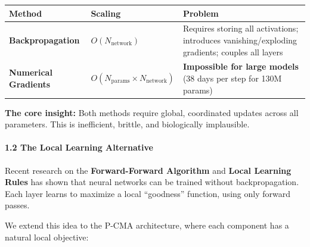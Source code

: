 \documentclass[
  11pt,
  a4paper,
]{article}
\begin{document}
\begin{longtable}[]{@{}
  >{\raggedright\arraybackslash}p{}
  >{\raggedright\arraybackslash}p{}
  >{\raggedright\arraybackslash}p{}@{}}
\toprule\noalign{}
\begin{minipage}[b]{\linewidth}\raggedright
Method
\end{minipage} & \begin{minipage}[b]{\linewidth}\raggedright
Scaling
\end{minipage} & \begin{minipage}[b]{\linewidth}\raggedright
Problem
\end{minipage} \\
\midrule\noalign{}
\endhead
\bottomrule\noalign{}
\endlastfoot
\textbf{Backpropagation} & \(O(N_{\text{network}})\) & Requires storing
all activations; introduces vanishing/exploding gradients; couples all
layers \\
\textbf{Numerical Gradients} &
\(O(N_{\text{params}} \times N_{\text{network}})\) & \textbf{Impossible
for large models} (38 days per step for 130M params) \\
\end{longtable}

\textbf{The core insight:} Both methods require global, coordinated
updates across all parameters. This is inefficient, brittle, and
biologically implausible.

\paragraph{1.2 The Local Learning
Alternative}\label{the-local-learning-alternative}

Recent research on the \textbf{Forward-Forward Algorithm} and
\textbf{Local Learning Rules} has shown that neural networks can be
trained without backpropagation. Each layer learns to maximize a local
``goodness'' function, using only forward passes.

We extend this idea to the P-CMA architecture, where each component has
a natural local objective:
\end{document}
